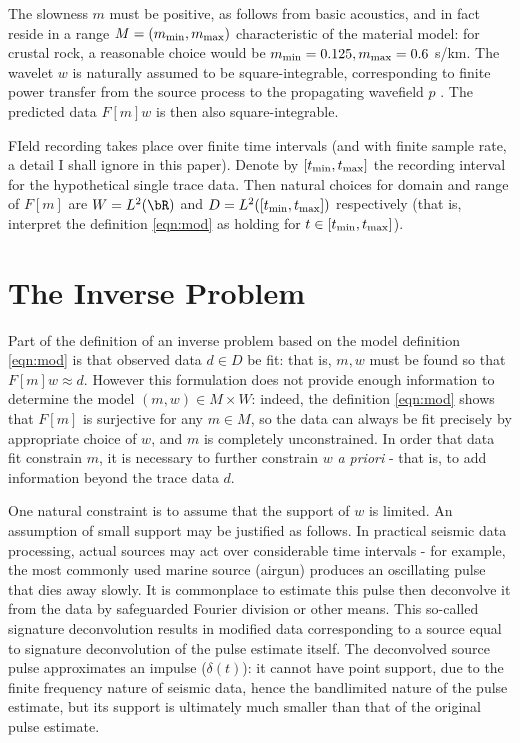 The slowness $m$ must be positive, as follows from basic acoustics,
and in fact reside in a range $M=(m_{\rm min}, m_{\rm max})$ characteristic of the
material model: for crustal rock, a reasonable choice would be
$m_{\rm min}=0.125, m_{\rm max}=0.6$ s/km. The wavelet $w$ is
naturally assumed to be 
square-integrable, corresponding to finite power transfer from the
source process to the propagating wavefield $p$
\cite[]{SantosaSymes:00}. The predicted data $F[m]w$ is then also
square-integrable.

FIeld recording takes place over finite time intervals (and with
finite sample rate, a detail I shall ignore in this paper). Denote by
$[t_{\rm min},t_{\rm max}]$ the recording interval for the
hypothetical single trace data. Then natural choices for domain and
range of $F[m]$ are $W = L^2(\bR)$ and $D=L^2([t_{\rm min},t_{\rm
  max}])$ respectively (that is, interpret the definition \ref{eqn:mod}
as holding for $t \in [t_{\rm min},t_{\rm  max}]$).





\section{The Inverse Problem}

Part of the definition of an inverse problem based on the model
definition \ref{eqn:mod} is that observed data $d \in D$ be fit: that
is, $m, w$ must be found so that $F[m]w \approx d$. However this
formulation does not provide enough information to determine the model
$(m,w) \in M \times W$: indeed, the definition
\ref{eqn:mod} shows that $F[m]$ is surjective for any $m \in M$, so
the data can always be fit precisely by appropriate choice of $w$, and
$m$ is completely
unconstrained.  In order that data fit constrain $m$, it is necessary
to further constrain $w$ {\em a priori} - that is, to add information
beyond the trace data $d$.

One natural constraint is to assume that the support of $w$ is
limited. An assumption of small support may be justified as
follows. In practical seismic data processing, actual sources may act
over considerable time intervals - for example, the most commonly used
marine source (airgun) produces an oscillating pulse that dies away
slowly. It is commonplace to estimate this pulse then deconvolve it
from the data by safeguarded Fourier division or other means. This
so-called signature deconvolution results in modified data
corresponding to a source equal to signature deconvolution of the
pulse estimate itself. The deconvolved source pulse approximates an
impulse ($\delta(t)$): it cannot have point support, due to the finite
frequency nature of seismic data, hence the bandlimited nature of the
pulse estimate, but its support is ultimately much smaller than that
of the original pulse estimate.

